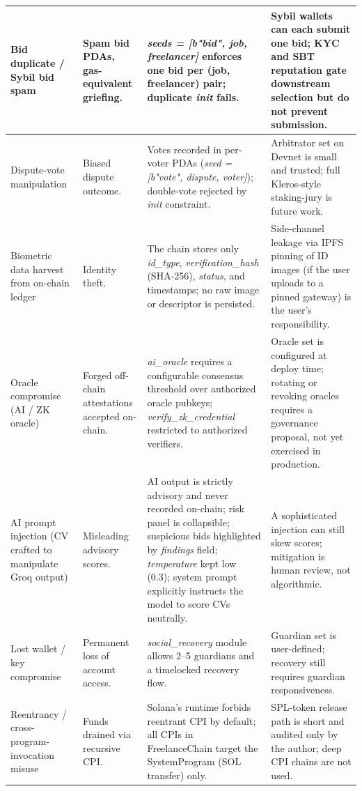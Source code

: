 \begin{table}[H]
\begin{tabular}{|p{3.0cm}|p{3.0cm}|p{4.5cm}|p{3.0cm}|}
Bid duplicate / Sybil bid spam & Spam bid PDAs, gas-equivalent griefing. & \emph{seeds = [b"bid", job, freelancer]} enforces one bid per (job, freelancer) pair; duplicate \emph{init} fails. & Sybil wallets can each submit one bid; KYC and SBT reputation gate downstream selection but do not prevent submission. \\ \hline
Dispute-vote manipulation & Biased dispute outcome. & Votes recorded in per-voter PDAs (\emph{seed = [b"vote", dispute, voter]}); double-vote rejected by \emph{init} constraint. & Arbitrator set on Devnet is small and trusted; full Kleros-style staking-jury is future work. \\ \hline
Biometric data harvest from on-chain ledger & Identity theft. & The chain stores only \emph{id\_type}, \emph{verification\_hash} (SHA-256), \emph{status}, and timestamps; no raw image or descriptor is persisted. & Side-channel leakage via IPFS pinning of ID images (if the user uploads to a pinned gateway) is the user's responsibility. \\ \hline
Oracle compromise (AI / ZK oracle) & Forged off-chain attestations accepted on-chain. & \emph{ai\_oracle} requires a configurable consensus threshold over authorized oracle pubkeys; \emph{verify\_zk\_credential} restricted to authorized verifiers. & Oracle set is configured at deploy time; rotating or revoking oracles requires a governance proposal, not yet exercised in production. \\ \hline
AI prompt injection (CV crafted to manipulate Groq output) & Misleading advisory scores. & AI output is strictly advisory and never recorded on-chain; risk panel is collapsible; suspicious bids highlighted by \emph{findings} field; \emph{temperature} kept low (0.3); system prompt explicitly instructs the model to score CVs neutrally. & A sophisticated injection can still skew scores; mitigation is human review, not algorithmic. \\ \hline
Lost wallet / key compromise & Permanent loss of account access. & \emph{social\_recovery} module allows 2--5 guardians and a timelocked recovery flow. & Guardian set is user-defined; recovery still requires guardian responsiveness. \\ \hline
Reentrancy / cross-program-invocation misuse & Funds drained via recursive CPI. & Solana's runtime forbids reentrant CPI by default; all CPIs in FreelanceChain target the SystemProgram (SOL transfer) only. & SPL-token release path is short and audited only by the author; deep CPI chains are not used. \\ \hline
\end{tabular}
\end{table}

